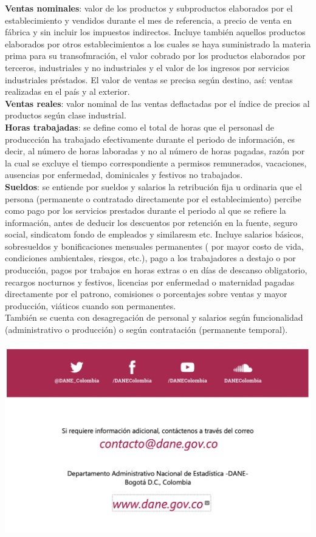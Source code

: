 \documentclass[
]{article}
\begin{document}
\textbf{Ventas nominales}: valor de los productos y subproductos
elaborados por el establecimiento y vendidos durante el mes de
referencia, a precio de venta en fábrica y sin incluir los impuestos
indirectos. Incluye también aquellos productos elaborados por otros
establecimientos a los cuales se haya suministrado la materia prima para
su transofmración, el valor cobrado por los productos elaborados por
terceros, industriales y no industriales y el valor de los ingresos por
servicios industriales préstados. El valor de ventas se precisa según
destino, así: ventas realizadas en el país y al exterior.\\

\textbf{Ventas reales}: valor nominal de las ventas deflactadas por el
índice de precios al productos según clase industrial.\\

\textbf{Horas trabajadas}: se define como el total de horas que el
personasl de produccción ha trabajado efectivamente durante el periodo
de información, es decir, al número de horas laboradas y no al número de
horas pagadas, razón por la cual se excluye el tiempo correspondiente a
permisos remunerados, vacaciones, ausencias por enfermedad, dominicales
y festivos no trabajados.\\

\textbf{Sueldos}: se entiende por sueldos y salarios la retribución fija
u ordinaria que el persona (permanente o contratado directamente por el
establecimiento) percibe como pago por los servicios prestados durante
el periodo al que se refiere la información, antes de deducir los
descuentos por retención en la fuente, seguro social, sindicatom fondo
de empleados y similaresm etc. Incluye salarios básicos, sobresueldos y
bonificaciones mensuales permanentes ( por mayor costo de vida,
condiciones ambientales, riesgos, etc.), pago a los trabajadores a
destajo o por producción, pagos por trabajos en horas extras o en días
de descanso obligatorio, recargos nocturnos y festivos, licencias por
enfermedad o maternidad pagadas directamente por el patrono, comisiones
o porcentajes sobre ventas y mayor producción, viáticos cuando son
permanentes.\\

También se cuenta con desagregación de personal y salarios según
funcionalidad (administrativo o producción) o según contratación
(permanente temporal). \newpage

\includegraphics[width=18cm]{img/infodane.png}
\end{document}
